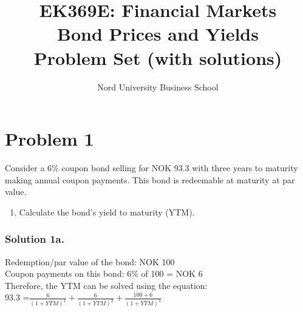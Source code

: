\documentclass[12]{article}
\title{EK369E: Financial Markets\\ Bond Prices and Yields\\ Problem Set (with solutions)}
\author{Nord University Business School}
\date{}
\begin{document}
\maketitle

\color{black}
\section*{Problem 1}
Consider a 6\% coupon bond selling for NOK 93.3 with three years to maturity making annual coupon payments. This bond is redeemable at maturity at par value.
\begin{enumerate}
    \item[a)] Calculate the bond’s yield to maturity (YTM).  
\end{enumerate}

\color{blue}
\subsubsection*{Solution 1a.}
Redemption/par value of the bond: NOK 100\\
Coupon payments on this bond: 6\% of 100 = NOK 6\\
Therefore, the YTM can be solved using the equation:\\
93.3 ={\Large $ \frac{6}{(1+YTM)^1} + \frac{6}{(1+YTM)^2} + \frac{100 +6}{(1+YTM)^3}$}\\
\end{document}
